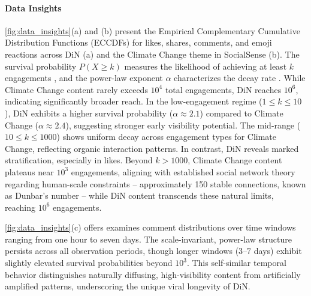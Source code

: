 \paragraph{Data Insights}
\cref{fig:data_insights}(a) and (b) present the Empirical Complementary Cumulative Distribution Functions (ECCDFs) for likes, shares, comments, and emoji reactions across DiN (a) and the Climate Change theme in SocialSense (b). The survival probability $P(X \geq k)$ measures the likelihood of achieving at least $k$ engagements \citep{clauset2009power}, and the power-law exponent $\alpha$ characterizes the decay rate \citep{newman2005power}. While Climate Change content rarely exceeds $10^4$ total engagements, DiN reaches $10^6$, indicating significantly broader reach.
In the low-engagement regime ($1 \leq k \leq 10$), DiN exhibits a higher survival probability ($\alpha \approx 2.1$) compared to Climate Change ($\alpha \approx 2.4$), suggesting stronger early visibility potential. The mid-range ($10 \leq k \leq 1000$) shows uniform decay across engagement types for Climate Change, reflecting organic interaction patterns. In contrast, DiN reveals marked stratification, especially in likes. Beyond $k > 1000$, Climate Change content plateaus near $10^3$ engagements, aligning with established social network theory regarding human-scale constraints -- approximately 150 stable connections, known as Dunbar’s number \citep{dunbar1992neocortex} -- while DiN content transcends these natural limits, reaching $10^6$ engagements.

\cref{fig:data_insights}(c) offers examines comment distributions over time windows ranging from one hour to seven days. The scale-invariant, power-law structure persists across all observation periods, though longer windows ($3$–$7$ days) exhibit slightly elevated survival probabilities beyond $10^3$. This self-similar temporal behavior distinguishes naturally diffusing, high-visibility content from artificially amplified patterns, underscoring the unique viral longevity of DiN.

